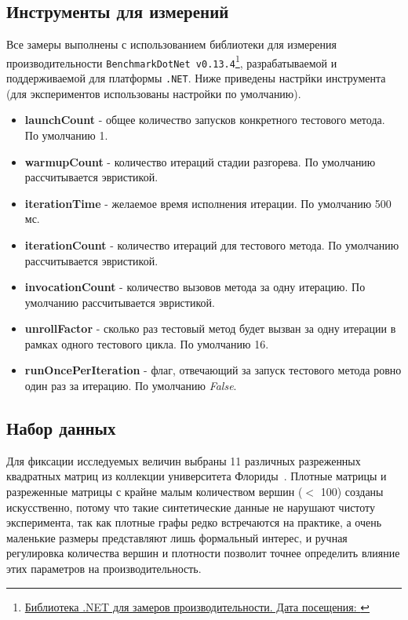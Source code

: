 \subsection{Инструменты для измерений}
\noindent Все замеры выполнены с использованием библиотеки для измерения производительности \texttt{BenchmarkDotNet v0.13.4}\footnote{\href{https://benchmarkdotnet.org/}{Библиотека .NET для замеров производительности. Дата посещения: }}, разрабатываемой и поддерживаемой для платформы \texttt{.NET}. Ниже приведены настрйки инструмента (для экспериментов использованы настройки по умолчанию).
\begin{itemize}[label=--]
    \item{\textbf{launchCount}} - общее количество запусков конкретного тестового метода. По умолчанию 1.
    \item{\textbf{warmupCount}} - количество итераций стадии разгорева. По умолчанию рассчитывается эвристикой.
    \item{\textbf{iterationTime}} - желаемое время исполнения итерации. По умолчанию 500 мс.
    \item{\textbf{iterationCount}} - количество итераций для тестового метода. По умолчанию рассчитывается эвристикой.
    \item{\textbf{invocationCount}} - количество вызовов метода за одну итерацию. По умолчанию рассчитывается эвристикой.
    \item{\textbf{unrollFactor}} - сколько раз тестовый метод будет вызван за одну итерации в рамках одного тестового цикла. По умолчанию 16.
    \item{\textbf{runOncePerIteration}} - флаг, отвечающий за запуск тестового метода ровно один раз за итерацию. По умолчанию \textit{False}.
\end{itemize}



\subsection{Набор данных}
\noindent Для фиксации исследуемых величин выбраны 11 различных разреженных квадратных матриц из коллекции университета Флориды~\cite{matrixData}. Плотные матрицы и разреженные матрицы с крайне малым количеством вершин ($<$ 100) созданы искусственно, потому что такие синтетические данные не нарушают чистоту эксперимента, так как плотные графы редко встречаются на практике, а очень маленькие размеры представляют лишь формальный интерес, и ручная регулировка количества вершин и плотности позволит точнее определить влияние этих параметров на производительность.

